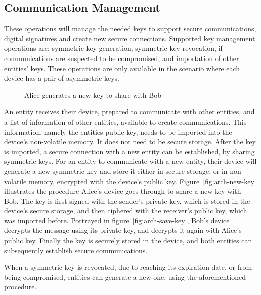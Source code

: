 \subsection{Communication Management}\label{chap:arch:ops:key}

These operations will manage the needed keys to support secure communications, digital signatures and create new secure connections.
Supported key management operations are: symmetric key generation, symmetric key revocation, if communications are suspected to be compromised, and importation of other entities' keys.
These operations are only available in the scenario where each device has a pair of asymmetric keys.

\begin{figure}[h]
	\centering     %
	\caption{Alice generates a new key to share with Bob}
\end{figure}

An entity receives their device, prepared to communicate with other entities, and a list of information of other entities, available to create communications. This information, namely the entities public key, needs to be imported into the device's non-volatile memory. It does not need to be secure storage.
After the key is imported, a secure connection with a new entity can be established, by sharing symmetric keys.
For an entity to communicate with a new entity, their device will generate a new symmetric key and store it either in secure storage, or in non-volatile memory, encrypted with the device's public key. Figure~\ref{fig:arch-new-key} illustrates the procedure Alice's device goes through to share a new key with Bob. The key is first signed with the sender's private key, which is stored in the device's secure storage, and then ciphered with the receiver's public key, which was imported before. Portrayed in figure~\ref{fig:arch-save-key}, Bob's device decrypts the message using its private key, and decrypts it again with Alice's public key. Finally the key is securely stored in the device, and both entities can subsequently establish secure communications.

When a symmetric key is revocated, due to reaching its expiration date, or from being compromised, entities can generate a new one, using the aforementioned procedure.
